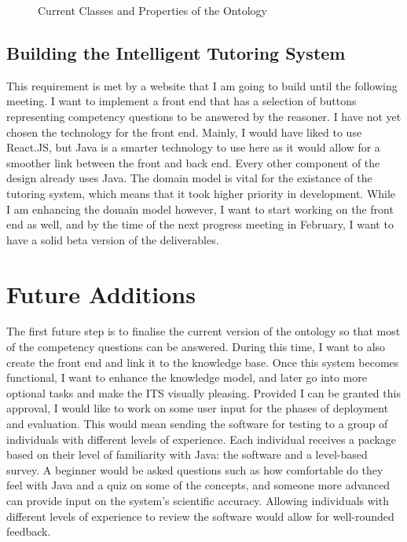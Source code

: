\documentclass[titlepage]{article}
\begin{document}
\begin{figure}
    \caption{Current Classes and Properties of the Ontology}
\end{figure}
\newpage
\subsection{Building the Intelligent Tutoring System}
This requirement is met by a website that I am going to build until the following meeting. I want to implement a front end that has a selection of buttons representing competency questions to be answered by the reasoner.
\newline
I have not yet chosen the technology for the front end. Mainly, I would have liked to use React.JS, but Java is a smarter technology to use here as it would allow for a smoother link between the front and back end. Every other component of the design already uses Java.
\newline
The domain model is vital for the existance of the tutoring system, which means that it took higher priority in development. While I am enhancing the domain model however, I want to start working on the front end as well, and by the time of the next progress meeting in February, I want to have a solid beta version of the deliverables.

\section{Future Additions}
The first future step is to finalise the current version of the ontology so that most of the competency questions can be answered. During this time, I want to also create the front end and link it to the knowledge base. Once this system becomes functional, I want to enhance the knowledge model, and later go into more optional tasks and make the ITS visually pleasing.
\newline
Provided I can be granted this approval, I would like to work on some user input for the phases of deployment and evaluation. This would mean sending the software for testing to a group of individuals with different levels of experience. Each individual receives a package based on their level of familiarity with Java: the software and a level-based survey. A beginner would be asked questions such as how comfortable do they feel with Java and a quiz on some of the concepts, and someone more advanced can provide input on the system's scientific accuracy. Allowing individuals with different levels of experience to review the software would allow for well-rounded feedback.
\end{document}

